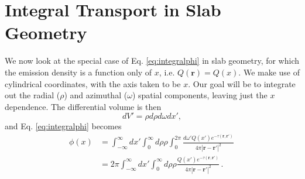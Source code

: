 \section*{Integral Transport in Slab Geometry}

We now look at the special case of Eq. \ref{eq:integralphi} in slab geometry, for which the emission density is a function only of $x$, i.e. $Q(\mathbf{r}) = Q(x)$.  We make use of cylindrical coordinates, with the axis taken to be $x$.  Our goal will be to integrate out the radial ($\rho$) and azimuthal ($\omega$) spatial components, leaving just the $x$ dependence. The differential volume is then
\begin{equation}
 dV' = \rho d\rho d\omega dx' ,
\end{equation}
and Eq. \ref{eq:integralphi} becomes
\begin{equation}
\begin{split}
 \phi(x) &= \int^{\infty}_{-\infty} dx' \int^{\infty}_0 d\rho \rho \int^{2\pi}_0 \frac{ d\omega' Q(x')e^{-\tau(\mathbf{r},\mathbf{r}')}}{4\pi|\mathbf{r}-\mathbf{r}'|^2} \, \\
        &= 2\pi \int^{\infty}_{-\infty}dx' \int^{\infty}_0 d\rho \rho \frac{ Q(x')e^{-\tau(\mathbf{r},\mathbf{r}')}}{4\pi |\mathbf{r}-\mathbf{r}'|^2} \, .
\end{split}
\label{eq:integralphix}
\end{equation}

